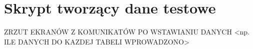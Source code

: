 \section{Skrypt tworzący dane testowe}

ZRZUT EKRANÓW Z KOMUNIKATÓW PO WSTAWIANIU DANYCH <np. ILE DANYCH
DO KAZDEJ TABELI WPROWADZONO>